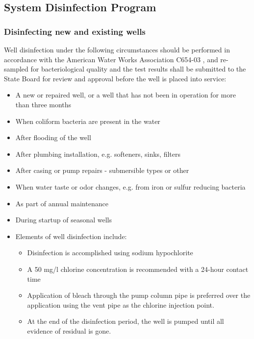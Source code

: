 \subsection{System Disinfection Program} 
\subsubsection{Disinfecting new and existing wells} 
Well disinfection under the following circumstances should be performed in accordance with the American Water Works Association C654-03 , and re-sampled for bacteriological quality and the test results shall be submitted to the State Board for review and approval before the well is placed into service: \\
\begin{itemize}
\item A new or repaired well, or a well that has not been in operation for more than three months
\item When coliform bacteria are present in the water
\item After flooding of the well
\item After plumbing installation, e.g. softeners, sinks, filters
\item After casing or pump repairs - submersible types or other
\item When water taste or odor changes, e.g. from iron or sulfur reducing bacteria
\item As part of annual maintenance
\item During startup of seasonal wells
\item Elements of well disinfection include:
\begin{itemize}
\item Disinfection is accomplished using sodium hypochlorite
\item A 50 mg/l chlorine concentration is recommended with a 24-hour contact time
\item Application of bleach through the pump column pipe is preferred over the application using the vent pipe as the chlorine injection point.
\item At the end of the disinfection period, the well is pumped until all evidence of residual is gone.
\end{itemize}
\end{itemize}

